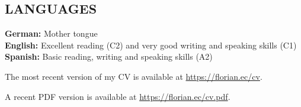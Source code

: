 \documentclass[margin]{res}
\begin{document}
\begin{resume}
\section{LANGUAGES}

\textbf{German:} Mother tongue \\
\textbf{English:} Excellent reading (C2) and very good writing and speaking skills (C1) \\
\textbf{Spanish:} Basic reading, writing and speaking skills (A2)


\end{resume}

\vspace{15 mm}

The most recent version of my CV is available at \url{https://florian.ec/cv}.

A recent PDF version is available at \url{https://florian.ec/cv.pdf}.
\end{document}
